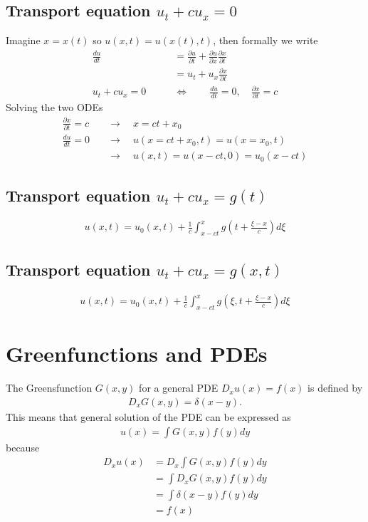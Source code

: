 \documentclass[../main.tex]{subfiles}
\begin{document}
\subsection{Transport equation $u_t+cu_x=0$}
Imagine $x=x(t)$ so $u(x,t)=u(x(t),t)$, then formally we write
\begin{align}
\frac{du}{dt}&=\frac{\partial u}{\partial t}+\frac{\partial u}{\partial x}\frac{\partial x}{\partial t}\\
&=u_t+u_x\frac{\partial x}{\partial t}\\
u_t+cu_x=0\qquad &\Leftrightarrow \qquad \frac{du}{dt}=0,\quad \frac{\partial x}{\partial t}=c
\end{align}
Solving the two ODEs
\begin{align}
\frac{\partial x}{\partial t}=c\quad&\rightarrow\quad x=ct+x_0\\
\frac{du}{dt}=0\quad&\rightarrow\quad u(x=ct+x_0,t)=u(x=x_0,t)\\
&\rightarrow\quad u(x,t)=u(x-ct,0)=u_0(x-ct)
\end{align}

\subsection{Transport equation $u_t+cu_x=g(t)$}
\begin{align}
u(x,t)=u_0(x,t)+\frac{1}{c}\int_{x-ct}^x g\left(t+\frac{\xi-x}{c}\right)d\xi
\end{align}

\subsection{Transport equation $u_t+cu_x=g(x,t)$}
\begin{align}
u(x,t)=u_0(x,t)+\frac{1}{c}\int_{x-ct}^x g\left(\xi,t+\frac{\xi-x}{c}\right)d\xi
\end{align}

\section{Greenfunctions and PDEs}
The Greensfunction $G(x,y)$ for a general PDE $D_x u(x) = f(x)$ is defined by
\begin{align}
    D_x G(x,y) = \delta(x-y).
\end{align}
This means that general solution of the PDE can be expressed as
\begin{align}
    u(x)=\int G(x,y)f(y)dy
\end{align}
because
\begin{align}
    D_x u(x)
    &=D_x \int G(x,y)f(y)dy\\
    &=\int D_x G(x,y)f(y)dy\\
    &=\int \delta(x-y) f(y)dy\\
    &=f(x)
\end{align}
\end{document}
